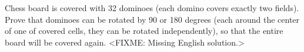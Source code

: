 \problem
Chess board is covered with 32 dominoes (each domino covers exactly two
fields).
Prove that dominoes can be rotated by 90 or 180 degrees (each around the center
of one of covered cells, they can be rotated independently), so that the entire
board will be covered again.
\solution
<FIXME: Missing English solution.>
\endproblem
